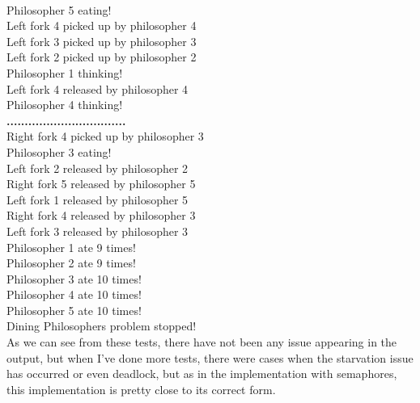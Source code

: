 \documentclass[14pt]{article}
\begin{document}
\\Philosopher 5 eating!
\\Left fork 4 picked up by philosopher 4
\\Left fork 3 picked up by philosopher 3
\\Left fork 2 picked up by philosopher 2
\\Philosopher 1 thinking!
\\Left fork 4 released by philosopher 4
\\Philosopher 4 thinking!
\\\textbf{.................................}
\\Right fork 4 picked up by philosopher 3
\\Philosopher 3 eating!
\\Left fork 2 released by philosopher 2
\\Right fork 5 released by philosopher 5
\\Left fork 1 released by philosopher 5
\\Right fork 4 released by philosopher 3
\\Left fork 3 released by philosopher 3
\\Philosopher 1 ate 9 times!
\\Philosopher 2 ate 9 times!
\\Philosopher 3 ate 10 times!
\\Philosopher 4 ate 10 times!
\\Philosopher 5 ate 10 times!
\\Dining Philosophers problem stopped!
\vspace{2.5 mm}
\\As we can see from these tests, there have not been any issue appearing in the output, but when I've done more tests, there were cases when the starvation issue has occurred or even deadlock, but as in the implementation with semaphores, this implementation is pretty close to its correct form.
\end{document}
